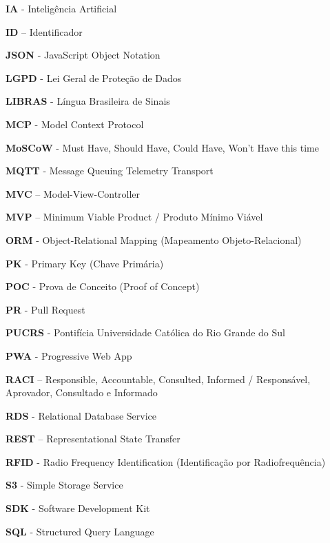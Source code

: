 \noindent \textbf{IA} - Inteligência Artificial\par
\noindent \textbf{ID} – Identificador\par
\noindent \textbf{JSON} - JavaScript Object Notation\par
\noindent \textbf{LGPD} - Lei Geral de Proteção de Dados\par
\noindent \textbf{LIBRAS} - Língua Brasileira de Sinais\par
\noindent \textbf{MCP} - Model Context Protocol\par
\noindent \textbf{MoSCoW} - Must Have, Should Have, Could Have, Won’t Have this time\par
\noindent \textbf{MQTT} - Message Queuing Telemetry Transport\par
\noindent \textbf{MVC} – Model-View-Controller\par
\noindent \textbf{MVP} – Minimum Viable Product / Produto Mínimo Viável\par
\noindent \textbf{ORM} - Object-Relational Mapping (Mapeamento Objeto-Relacional)\par
\noindent \textbf{PK} - Primary Key (Chave Primária)\par
\noindent \textbf{POC} - Prova de Conceito (Proof of Concept)\par
\noindent \textbf{PR} - Pull Request\par
\noindent \textbf{PUCRS} - Pontifícia Universidade Católica do Rio Grande do Sul\par
\noindent \textbf{PWA} - Progressive Web App\par
\noindent \textbf{RACI} – Responsible, Accountable, Consulted, Informed / Responsável, Aprovador, Consultado e Informado\par
\noindent \textbf{RDS} - Relational Database Service\par
\noindent \textbf{REST} – Representational State Transfer\par
\noindent \textbf{RFID} - Radio Frequency Identification (Identificação por Radiofrequência)\par
\noindent \textbf{S3} - Simple Storage Service\par
\noindent \textbf{SDK} - Software Development Kit\par
\noindent \textbf{SQL} - Structured Query Language\par
